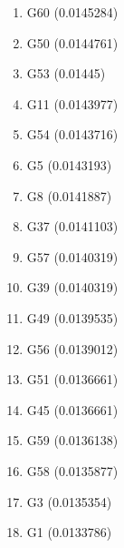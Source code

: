 \begin{enumerate}
\item G60 (0.0145284)
\item G50 (0.0144761)
\item G53 (0.01445)
\item G11 (0.0143977)
\item G54 (0.0143716)
\item G5 (0.0143193)
\item G8 (0.0141887)
\item G37 (0.0141103)
\item G57 (0.0140319)
\item G39 (0.0140319)
\item G49 (0.0139535)
\item G56 (0.0139012)
\item G51 (0.0136661)
\item G45 (0.0136661)
\item G59 (0.0136138)
\item G58 (0.0135877)
\item G3 (0.0135354)
\item G1 (0.0133786)
\end{enumerate}